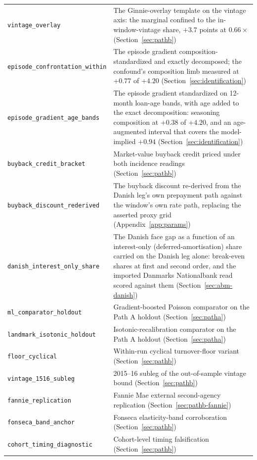 \documentclass[12pt]{article}
\begin{document}
{\begin{longtable}{@{}p{5.4cm}p{8.8cm}@{}}
\texttt{vintage\_overlay} & The Ginnie-overlay template on the vintage axis: the marginal confined to the in-window-vintage share, $+3.7$ points at $0.66\times$ (Section~\ref{sec:pathb}) \\
\texttt{episode\_confrontation\_within} & The episode gradient composition-standardized and exactly decomposed; the confound's composition limb measured at $+0.77$ of $+4.20$ (Section~\ref{sec:identification}) \\ \texttt{episode\_gradient\_age\_bands} & The episode gradient standardized on 12-month loan-age bands, with age added to the exact decomposition: seasoning composition at $+0.38$ of $+4.20$, and an age-augmented interval that covers the model-implied $+0.94$ (Section~\ref{sec:identification}) \\
\texttt{buyback\_credit\_bracket} & Market-value buyback credit priced under both incidence readings (Section~\ref{sec:pathb}) \\
\texttt{buyback\_discount\_rederived} & The buyback discount re-derived from the Danish leg's own prepayment path against the window's own rate path, replacing the asserted proxy grid (Appendix~\ref{app:params}) \\
\texttt{danish\_interest\_only\_share} & The Danish face gap as a function of an interest-only (deferred-amortisation) share carried on the Danish leg alone: break-even shares at first and second order, and the imported Danmarks Nationalbank read scored against them (Section~\ref{sec:abm-danish}) \\
\texttt{ml\_comparator\_holdout} & Gradient-boosted Poisson comparator on the Path A holdout (Section~\ref{sec:patha}) \\
\texttt{landmark\_isotonic\_holdout} & Isotonic-recalibration comparator on the Path A holdout (Section~\ref{sec:patha}) \\
\texttt{floor\_cyclical} & Within-run cyclical turnover-floor variant (Section~\ref{sec:pathb}) \\
\texttt{vintage\_1516\_subleg} & 2015--16 subleg of the out-of-sample vintage bound (Section~\ref{sec:pathb}) \\
\texttt{fannie\_replication} & Fannie Mae external second-agency replication (Section~\ref{sec:pathb-fannie}) \\
\texttt{fonseca\_band\_anchor} & Fonseca elasticity-band corroboration (Section~\ref{sec:pathb}) \\
\texttt{cohort\_timing\_diagnostic} & Cohort-level timing falsification (Section~\ref{sec:pathb}) \\

\end{longtable}}
\end{document}
